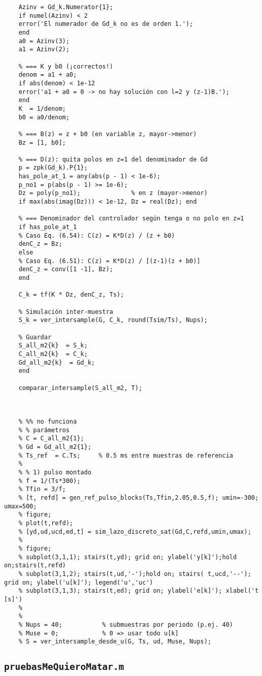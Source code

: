 {\begin{lstlisting}[style=matlabstyle,caption={Hoja de cálculos para el diseño de los compensadores.}]
	% === A(z): orden 1 (A = a1 z + a0). En z^{-1} MATLAB da [a0 a1].
	Azinv = Gd_k.Numerator{1};
	if numel(Azinv) < 2
	error('El numerador de Gd_k no es de orden 1.');
	end
	a0 = Azinv(3); 
	a1 = Azinv(2);
	
	% === K y b0 (¡correctos!)
	denom = a1 + a0;
	if abs(denom) < 1e-12
	error('a1 + a0 = 0 -> no hay solución con l=2 y (z-1)B.');
	end
	K  = 1/denom;
	b0 = a0/denom;
	
	% === B(z) = z + b0 (en variable z, mayor->menor)
	Bz = [1, b0];
	
	% === D(z): quita polos en z=1 del denominador de Gd
	p = zpk(Gd_k).P{1};
	has_pole_at_1 = any(abs(p - 1) < 1e-6);
	p_no1 = p(abs(p - 1) >= 1e-6);
	Dz = poly(p_no1);              % en z (mayor->menor)
	if max(abs(imag(Dz))) < 1e-12, Dz = real(Dz); end
	
	% === Denominador del controlador según tenga o no polo en z=1
	if has_pole_at_1
	% Caso Eq. (6.54): C(z) = K*D(z) / (z + b0)
	denC_z = Bz;
	else
	% Caso Eq. (6.51): C(z) = K*D(z) / [(z-1)(z + b0)]
	denC_z = conv([1 -1], Bz);
	end
	
	C_k = tf(K * Dz, denC_z, Ts);
	
	% Simulación inter-muestra
	S_k = ver_intersample(G, C_k, round(Tsim/Ts), Nups);
	
	% Guardar
	S_all_m2{k}  = S_k;
	C_all_m2{k}  = C_k;
	Gd_all_m2{k}  = Gd_k;
	end
	
	comparar_intersample(S_all_m2, T);
	
	
	
	% %% no funciona
	% % parámetros
	% C = C_all_m2{1};
	% Gd = Gd_all_m2{1};
	% Ts_ref  = C.Ts;     % 0.5 ms entre muestras de referencia
	% 
	% % 1) pulso montado
	% f = 1/(Ts*300);
	% Tfin = 3/f;
	% [t, refd] = gen_ref_pulso_blocks(Ts,Tfin,2.05,0.5,f); umin=-300; umax=500;
	% figure;
	% plot(t,refd);
	% [yd,ud,ucd,ed,t] = sim_lazo_discreto_sat(Gd,C,refd,umin,umax);
	% 
	% figure;
	% subplot(3,1,1); stairs(t,yd); grid on; ylabel('y[k]');hold on;stairs(t,refd)
	% subplot(3,1,2); stairs(t,ud,'-');hold on; stairs( t,ucd,'--'); grid on; ylabel('u[k]'); legend('u','uc')
	% subplot(3,1,3); stairs(t,ed); grid on; ylabel('e[k]'); xlabel('t [s]')
	% 
	% 
	% Nups = 40;           % submuestras por periodo (p.ej. 40)
	% Muse = 0;            % 0 => usar todo u[k]
	% S = ver_intersample_desde_u(G, Ts, ud, Muse, Nups);
\end{lstlisting}

\subsection{\texttt{pruebasMeQuieroMatar.m}}
\begin{lstlisting}[style=matlabstyle,caption={Banco de pruebas y exploración de parámetros.}]
	% === Pegar aquí el contenido de pruebasMeQuieroMatar.m ===
\end{lstlisting}

}
